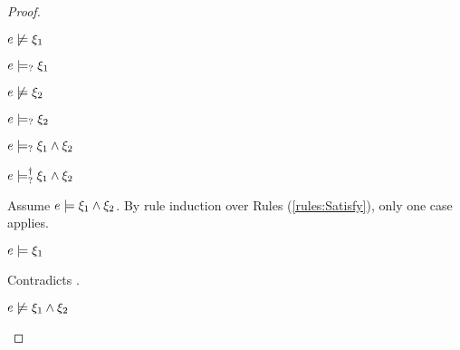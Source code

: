 \begin{proof}
\begin{byCases}
\begin{byCases}
    \item[\cmaysatisfy{e}{\xi_1},\cmaysatisfy{e}{\xi_2}]
        \begin{pfsteps*}
        \item $e \not\models \xi_1$  
        \item $e \models_{?} \xi_1$  
        \item $e \not\models \xi_2$  
        \item $e \models_{?} \xi_2$  
        \item $e \models_{?} \xi_1 \wedge \xi_2$  
        \item $e \models_{?}^{\dag} \xi_1 \wedge \xi_2$ 
        \end{pfsteps*}
        Assume $e \models \xi_1 \wedge \xi_2$. By rule induction over Rules (\ref{rules:Satisfy}), only one case applies.
        \begin{byCases}
        \item[\text{(\ref{rule:CSAnd})}]
            \begin{pfsteps*}
            \item $e \models \xi_1$ 
            \end{pfsteps*}
            Contradicts .
        \end{byCases}
        \begin{pfsteps*}
        \item $e \not\models \xi_1 \wedge \xi_2$ 
        \end{pfsteps*}
        

\end{byCases}
\end{byCases}
\end{proof}

